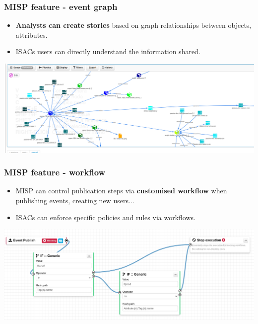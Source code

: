 \begin{frame}
    \frametitle{MISP feature - event graph}
    \begin{itemize}
        \item {\bf Analysts can create stories} based on graph relationships between objects, attributes.
         \item ISACs users can directly understand the information shared.
    \end{itemize}
    \includegraphics[scale=0.20]{event-graph.png}
\end{frame}

\begin{frame}
    \frametitle{MISP feature - workflow}
    \begin{itemize}
        \item MISP can control publication steps via {\bf customised workflow} when publishing events, creating new users... 
        \item ISACs can enforce specific policies and rules via workflows.  
    \end{itemize}
    \includegraphics[scale=0.20]{workflow.png}
\end{frame}


